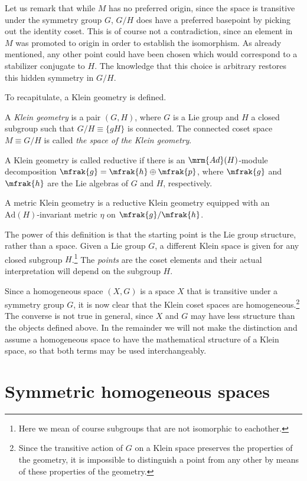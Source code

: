 \documentclass[11pt]{article}
\begin{document}
Let us remark that while $M$ has no preferred origin, since the 
space is transitive under the symmetry group $G$, $G/H$ does have 
a preferred basepoint by picking out the identity coset. This is 
of course not a contradiction, since an element in $M$ was 
promoted to origin in order to establish the isomorphism.  As 
already mentioned, any other point could have been chosen which 
would correspond to a stabilizer conjugate to $H$. The knowledge 
that this choice is arbitrary restores this hidden symmetry in 
$G/H$. 

To recapitulate, a Klein geometry is defined.
%
\begin{definition}
	A \emph{Klein geometry} is a pair $(G,H)$, where $G$ is a Lie 
	group and $H$ a closed subgroup such that $G/H \equiv \{gH\}$ 
	is connected. The connected coset space $M \equiv G/H$ is 
	called \emph{the space of the Klein geometry}.

	A Klein geometry is called reductive if there is an 
	$\mrm{Ad}(H)$-module decomposition $\mfrak{g} = \mfrak{h} 
	\oplus \mfrak{p}$, where $\mfrak{g}$ and $\mfrak{h}$ are the 
	Lie algebras of $G$ and $H$, respectively.
   
	A metric Klein geometry is a reductive Klein geometry equipped 
	with an $\mathrm{Ad}(H)$-invariant metric $\eta$ on 
	$\mfrak{g}/\mfrak{h}$.
\end{definition}
The power of this definition is that the starting point is the 
Lie group structure, rather than a space. Given a Lie group $G$, 
a different Klein space is given for any closed subgroup 
$H$.\footnote{Here we mean of course subgroups that are not 
	isomorphic to eachother.}
The \emph{points} are the coset elements and their actual 
interpretation will depend on the subgroup $H$.

Since a homogeneous space $(X,G)$ is a space $X$ that is 
transitive under a symmetry group $G$, it is now clear that the 
Klein coset spaces are homogeneous.\footnote{Since the transitive 
	action of $G$ on a Klein space preserves the properties of the 
	geometry, it is impossible to distinguish a point from any 
	other by means of these properties of the geometry.}
The converse is not true in general, since $X$ and $G$ may have 
less structure than the objects defined above. In the remainder 
we will not make the distinction and assume a homogeneous space 
to have the mathematical structure of a Klein space, so that both 
terms may be used interchangeably.

\section{Symmetric homogeneous spaces}
\end{document}
